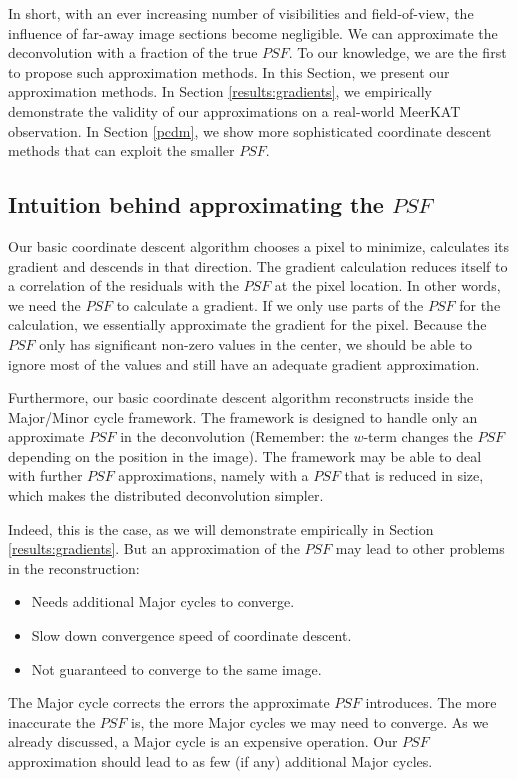 In short, with an ever increasing number of visibilities and field-of-view, the influence of far-away image sections become negligible. We can approximate the deconvolution with a fraction of the true $PSF$. To our knowledge, we are the first to propose such approximation methods. In this Section, we present our approximation methods. In Section \ref{results:gradients}, we empirically demonstrate the validity of our approximations on a real-world MeerKAT observation. In Section \ref{pcdm}, we show more sophisticated coordinate descent methods that can exploit the smaller $PSF$. 

\subsection{Intuition behind approximating the $PSF$}
Our basic coordinate descent algorithm chooses a pixel to minimize, calculates its gradient and descends in that direction. The gradient calculation reduces itself to a correlation of the residuals with the $PSF$ at the pixel location. In other words, we need the $PSF$ to calculate a gradient. If we only use parts of the $PSF$ for the calculation, we essentially approximate the gradient for the pixel. Because the $PSF$ only has significant non-zero values in the center, we should be able to ignore most of the values and still have an adequate gradient approximation.

Furthermore, our basic coordinate descent algorithm reconstructs inside the Major/Minor cycle framework. The framework is designed to handle only an approximate $PSF$ in the deconvolution (Remember: the $w$-term changes the $PSF$ depending on the position in the image). The framework may be able to deal with further $PSF$ approximations, namely with a $PSF$ that is reduced in size, which makes the distributed deconvolution simpler.

Indeed, this is the case, as we will demonstrate empirically in Section \ref{results:gradients}. But an approximation of the $PSF$ may lead to other problems in the reconstruction:
\begin{itemize}
	\item Needs additional Major cycles to converge.
	\item Slow down convergence speed of coordinate descent.
	\item Not guaranteed to converge to the same image.
\end{itemize}

The Major cycle corrects the errors the approximate $PSF$ introduces. The more inaccurate the $PSF$ is, the more Major cycles we may need to converge. As we already discussed, a Major cycle is an expensive operation. Our $PSF$ approximation should lead to as few (if any) additional Major cycles.

